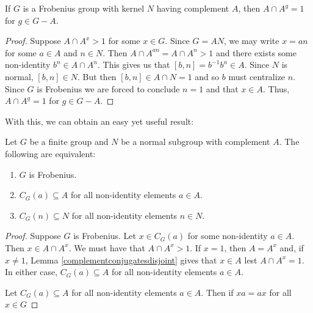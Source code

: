 \documentclass[main.tex]{subfiles}
\begin{document}
\begin{lemma}\label{complementconjugatesdisjoint}
If $G$ is a Frobenius group with kernel $N$ having complement $A$, then $A \cap A^g = 1$ for $g \in G - A$.
\end{lemma}

\begin{proof}
Suppose $A \cap A^x > 1$ for some $x \in G$. Since $G = AN$, we may write $x = an$ for some $a \in A$ and $n \in N$. Then $A \cap A^{an} = A \cap A^n > 1$ and there exists some non-identity $b^n \in A \cap A^n$. This gives us that $[b,n] = b^{-1}b^n \in A$. Since $N$ is normal, $[b, n] \in N$. But then $[b,n] \in A \cap N = 1$ and so $b$ must centralize $n$. Since $G$ is Frobenius we are forced to conclude $n = 1$ and that $x \in A$. Thus, $A \cap A^g = 1$ for $g \in G - A$.
\end{proof}

With this, we can obtain an easy yet useful result:

\begin{theorem}
Let $G$ be a finite group and $N$ be a normal subgroup with complement $A$. The following are equivalent:
\begin{enumerate}
	\item $G$ is Frobenius.
	\item $C_G(a) \subseteq A$ for all non-identity elements $a \in A$.
	\item $C_G(n) \subseteq N$ for all non-identity elements $n \in N$.
\end{enumerate}
\end{theorem}

\begin{proof}
Suppose $G$ is Frobenius. Let $x \in C_G(a)$ for some non-identity $a \in A$. Then $x \in A \cap A^x$. We must have that $A \cap A^x > 1$. If $x = 1$, then $A = A^x$ and, if $x \ne 1$, Lemma \ref{complementconjugatesdisjoint} gives that $x \in A$ lest $A \cap A^x = 1$. In either case, $C_G(a) \subseteq A$ for all non-identity elements $a \in A$.

Let $C_G(a) \subseteq A$ for all non-identity elements $a \in A$. Then if $xa = ax$ for all $x \in G$
\end{proof}
\end{document}
